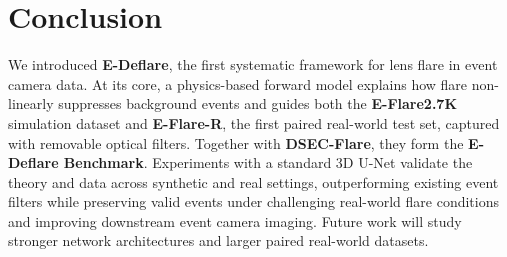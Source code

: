 \section{Conclusion}
\label{sec:conclusion}

We introduced \textbf{E-Deflare}, the first systematic framework for lens flare in event camera data. At its core, a physics-based forward model explains how flare non-linearly suppresses background events and guides both the \textbf{E-Flare2.7K} simulation dataset and \textbf{E-Flare-R}, the first paired real-world test set, captured with removable optical filters. Together with \textbf{DSEC-Flare}, they form the \textbf{E-Deflare Benchmark}. Experiments with a standard 3D U-Net validate the theory and data across synthetic and real settings, outperforming existing event filters while preserving valid events under challenging real-world flare conditions and improving downstream event camera imaging. Future work will study stronger network architectures and larger paired real-world datasets.

